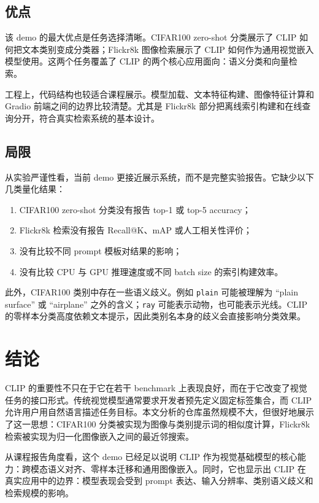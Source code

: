 \documentclass[UTF8,zihao=-4]{ctexart}
\begin{document}
\subsection{优点}

该 demo 的最大优点是任务选择清晰。CIFAR100 zero-shot 分类展示了 CLIP 如何把文本类别变成分类器；Flickr8k 图像检索展示了 CLIP 如何作为通用视觉嵌入模型使用。这两个任务覆盖了 CLIP 的两个核心应用面向：语义分类和向量检索。

工程上，代码结构也较适合课程展示。模型加载、文本特征构建、图像特征计算和 Gradio 前端之间的边界比较清楚。尤其是 Flickr8k 部分把离线索引构建和在线查询分开，符合真实检索系统的基本设计。

\subsection{局限}

从实验严谨性看，当前 demo 更接近展示系统，而不是完整实验报告。它缺少以下几类量化结果：
\begin{enumerate}[label=(\arabic*)]
  \item CIFAR100 zero-shot 分类没有报告 top-1 或 top-5 accuracy；
  \item Flickr8k 检索没有报告 Recall@K、mAP 或人工相关性评价；
  \item 没有比较不同 prompt 模板对结果的影响；
  \item 没有比较 CPU 与 GPU 推理速度或不同 batch size 的索引构建效率。
\end{enumerate}

此外，CIFAR100 类别中存在一些语义歧义。例如 \texttt{plain} 可能被理解为 ``plain surface'' 或 ``airplane'' 之外的含义；\texttt{ray} 可能表示动物，也可能表示光线。CLIP 的零样本分类高度依赖文本提示，因此类别名本身的歧义会直接影响分类效果。

\section{结论}

CLIP 的重要性不只在于它在若干 benchmark 上表现良好，而在于它改变了视觉任务的接口形式。传统视觉模型通常要求开发者预先定义固定标签集合，而 CLIP 允许用户用自然语言描述任务目标。本文分析的仓库虽然规模不大，但很好地展示了这一思想：CIFAR100 分类被实现为图像与类别提示词的相似度计算，Flickr8k 检索被实现为归一化图像嵌入之间的最近邻搜索。

从课程报告角度看，这个 demo 已经足以说明 CLIP 作为视觉基础模型的核心能力：跨模态语义对齐、零样本迁移和通用图像嵌入。同时，它也显示出 CLIP 在真实应用中的边界：模型表现会受到 prompt 表达、输入分辨率、类别语义歧义和检索规模的影响。
\end{document}
